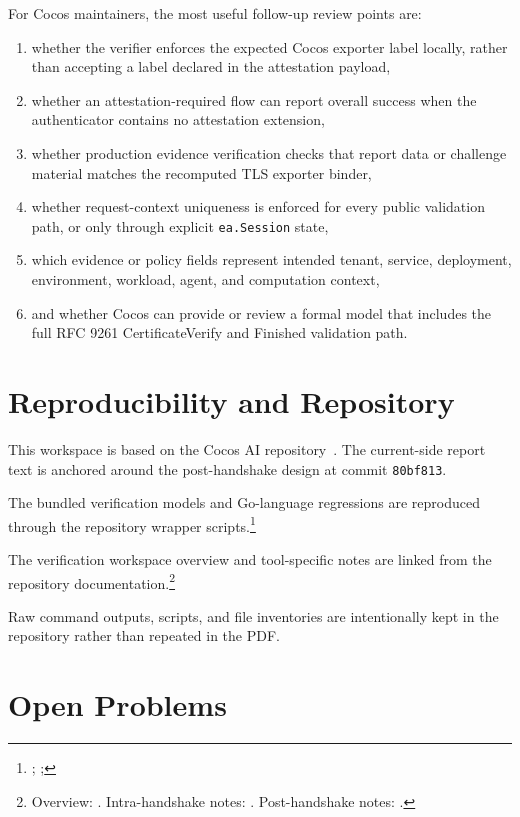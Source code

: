 \documentclass[11pt,a4paper]{article}
\begin{document}
For Cocos maintainers, the most useful follow-up review points are:

\begin{enumerate}
\item whether the verifier enforces the expected Cocos exporter label locally,
rather than accepting a label declared in the attestation payload,
\item whether an attestation-required flow can report overall success when the
authenticator contains no attestation extension,
\item whether production evidence verification checks that report data or
challenge material matches the recomputed TLS exporter binder,
\item whether request-context uniqueness is enforced for every public
validation path, or only through explicit \texttt{ea.Session} state,
\item which evidence or policy fields represent intended tenant, service,
deployment, environment, workload, agent, and computation context,
\item and whether Cocos can provide or review a formal model that includes the
full RFC 9261 CertificateVerify and Finished validation path.
\end{enumerate}

\section{Reproducibility and Repository}

This workspace is based on the Cocos AI repository~\cite{cocosrepo}. The
current-side report text is anchored around the post-handshake design at
commit \texttt{80bf813}.

The bundled verification models and Go-language regressions are reproduced
through the repository wrapper scripts.\footnote{;
; }

The verification workspace overview and tool-specific notes are linked from
the repository documentation.\footnote{Overview:
. Intra-handshake notes:
. Post-handshake notes:
.}

Raw command outputs, scripts, and file inventories are intentionally kept in
the repository rather than repeated in the PDF.

\section{Open Problems}
\end{document}
